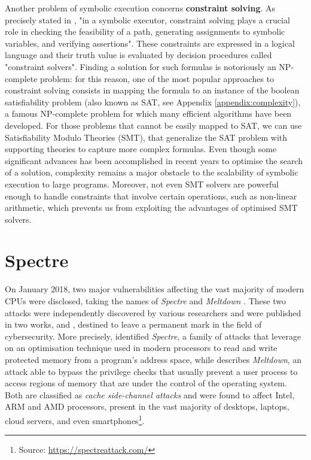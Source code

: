 \documentclass[12pt,a4paper]{book}
\theoremstyle{definition}
\begin{document}
	Another problem of symbolic execution concerns \textbf{constraint solving}. As precisely stated in \cite{Baldoni2018}, "in a symbolic executor, constraint solving plays a crucial role in checking the feasibility of a path, generating assignments to symbolic variables, and verifying assertions". These constraints are expressed in a logical language and their truth value is evaluated by decision procedures called "constraint solvers". 
	Finding a solution for such formulas is notoriously an NP-complete problem: for this reason, one of the most popular approaches to constraint solving consists in mapping the formula to an instance of the boolean satisfiability problem (also known as SAT, see Appendix \ref{appendix:complexity}), a famous NP-complete problem for which many efficient algorithms have been developed. For those problems that cannot be easily mapped to SAT, we can use Satisfiability Modulo Theories (SMT), that generalize the SAT problem with supporting theories to capture more complex formulas. Even though some significant advances has been accomplished in recent years to optimise the search of a solution, complexity remains a major obstacle to the scalability of symbolic execution to large programs. Moreover, not even SMT solvers are powerful enough to handle constraints that involve certain operations, such as non-linear arithmetic, which prevents us from exploiting the advantages of optimised SMT solvers.
	
	\chapter{Spectre}\label{chapter:spectre}
	On January 2018, two major vulnerabilities affecting the vast majority of modern CPUs were disclosed, taking the names of \textit{Spectre} \cite{Kocher2019} and \textit{Meltdown} \cite{Lipp2018}. These two attacks were independently discovered by various researchers and were published in 
	two works, \cite{Kocher2019} and \cite{Lipp2018}, destined to leave a permanent mark in the field of cybersecurity. More precisely, \cite{Kocher2019} identified \textit{Spectre}, a family of attacks that leverage on an optimisation technique used in modern processors to read and write protected memory from a program's address space, while \cite{Lipp2018} describes \textit{Meltdown}, an attack able to bypass the privilege checks that usually prevent a user process to access regions of memory that are under the control of the operating system. Both are classified as \textit{cache side-channel attacks} and were found to affect Intel, ARM and AMD processors, present in the vast majority of desktops, laptops, cloud servers, and even smartphones\footnote{Source: \url{https://spectreattack.com/}}.
	
\end{document}
